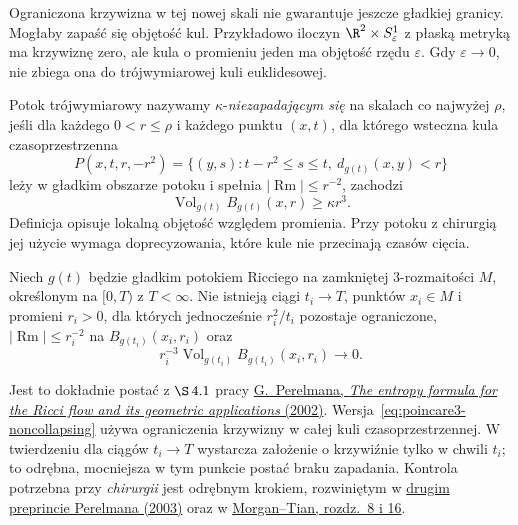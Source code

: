 Ograniczona krzywizna w tej nowej skali nie
gwarantuje jeszcze gładkiej granicy. Mogłaby
zapaść się objętość kul. Przykładowo iloczyn
$\R^2\times S^1_\varepsilon$ z płaską metryką
ma krzywiznę zero, ale kula o promieniu jeden
ma objętość rzędu $\varepsilon$. Gdy
$\varepsilon\to0$, nie zbiega ona do
trójwymiarowej kuli euklidesowej.

\begin{definicja}
\label{def:poincare3-noncollapsing}
Potok trójwymiarowy nazywamy
$\kappa$-\emph{niezapadającym się} na skalach
co najwyżej $\rho$, jeśli dla każdego
$0<r\leq\rho$ i każdego punktu $(x,t)$,
dla którego wsteczna kula czasoprzestrzenna
\[
 P(x,t,r,-r^2)=
 \{(y,s):t-r^2\leq s\leq t,
        \ d_{g(t)}(x,y)<r\}
\]
leży w gładkim obszarze potoku i spełnia
$|\operatorname{Rm}|\leq r^{-2}$,
zachodzi
\begin{equation}\label{eq:poincare3-noncollapsing}
 \operatorname{Vol}_{g(t)}B_{g(t)}(x,r)
 \geq\kappa r^3.
\end{equation}
Definicja opisuje lokalną objętość względem
promienia. Przy potoku z chirurgią jej użycie
wymaga doprecyzowania, które kule nie przecinają
czasów cięcia.
\end{definicja}

\begin{twierdzenie}
\label{thm:poincare3-perelman-noncollapse}
Niech $g(t)$ będzie gładkim potokiem Ricciego
na zamkniętej $3$-rozmaitości $M$, określonym
na $[0,T)$ z $T<\infty$. Nie istnieją ciągi
$t_i\to T$, punktów $x_i\in M$ i promieni
$r_i>0$, dla których jednocześnie
$r_i^2/t_i$ pozostaje ograniczone,
$|\operatorname{Rm}|\leq r_i^{-2}$
na $B_{g(t_i)}(x_i,r_i)$ oraz
\[
 r_i^{-3}\operatorname{Vol}_{g(t_i)}
 B_{g(t_i)}(x_i,r_i)\longrightarrow0.
\]
\end{twierdzenie}

Jest to dokładnie postać z $\S\,4.1$ pracy
\href{https://arxiv.org/pdf/math/0211159}
{G.\ Perelmana, \emph{The entropy formula for the
Ricci flow and its geometric applications} (2002)}.
Wersja~\eqref{eq:poincare3-noncollapsing}
używa ograniczenia krzywizny w całej kuli
czasoprzestrzennej. W twierdzeniu dla ciągów
$t_i\to T$ wystarcza założenie o krzywiźnie
tylko w chwili $t_i$; to odrębna, mocniejsza
w tym punkcie postać braku zapadania.
Kontrola potrzebna przy \emph{chirurgii} jest
odrębnym krokiem, rozwiniętym w
\href{https://arxiv.org/pdf/math/0303109}
{drugim preprincie Perelmana (2003)} oraz
w \href{https://www.claymath.org/library/monographs/cmim03.pdf}
{Morgan--Tian, rozdz.\ 8 i 16}.

